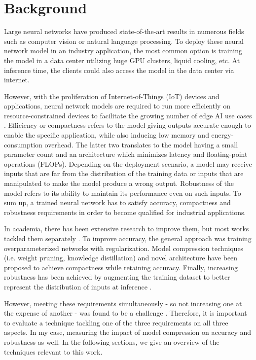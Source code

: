\section{Background}\label{sec:background}

Large neural networks have produced state-of-the-art results in numerous fields such as computer vision
 or natural language processing. To deploy these neural network model in an industry application, the most common option is training 
 the model in a data center utilizing huge GPU clusters, liquid cooling, etc. At inference time, the clients could also access the model in the data center 
 via internet.

 However, with the proliferation of Internet-of-Things (IoT) devices and applications, neural network models are required to run more efficiently on
 resource-constrained devices to facilitate the growing number of edge AI use cases \cite{edgeai}. Efficiency or compactness refers to the model giving outputs accurate
 enough to enable the specific application, while also inducing low memory and energy-consumption overhead. The latter two translates to the model having
 a small parameter count and an architecture which minimizes latency and floating-point operations (FLOPs). Depending on the deployment scenario, a model may
 receive inputs that are far from the distribution of the training data or inputs that are manipulated to make the model produce a wrong output. Robustness of 
 the model refers to its ability to maintain its performance even on such inputs.  To sum up, a trained neural network has to satisfy accuracy, compactness and robustness requirements in order to become qualified for industrial
  applications. 

  In academia, there has been extensive research to improve them, but most works tackled them separately \cite{effnet} \cite{pruning_survey24}.
  To improve accuracy, the general approach was training overparameterized networks with regularization. Model compression techniques (i.e. weight pruning, knowledge
  distillation) and novel architecture have been proposed to achieve compactness while retaining accuracy. Finally, increasing robustness has been achieved by 
  augmenting the training dataset to better represent the distribution of inputs at inference \cite{effectofadvtraining}.

  However, meeting these requirements simultaneously - so not increasing one at the expense of another - was found to be a challenge \cite{cards}.
  Therefore, it is important to evaluate a technique tackling one of the three requirements on all three aspects. In my case, measuring the impact of model
  compression on accuracy and robustness as well. In the following sections, we give an overview of the techniques relevant to this work. 

